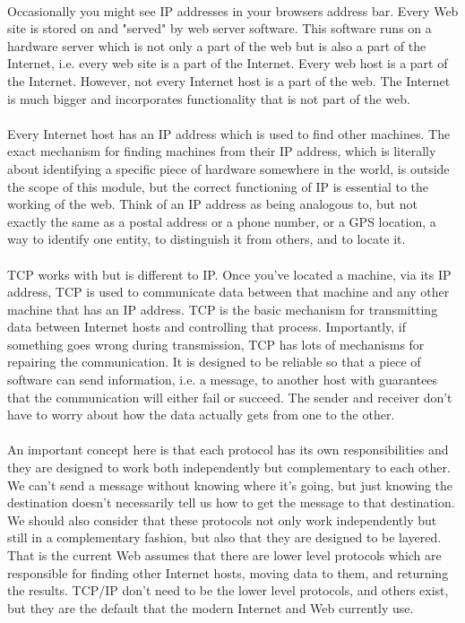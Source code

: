 \documentclass[12pt, a4paper, oneside]{book}
\begin{document}
\paragraph{} Occasionally you might see IP addresses in your browsers address bar. Every Web site is stored on and "served" by web server software. This software runs on a hardware server which is not only a part of the web but is also a part of the Internet, i.e. every web site is a part of the Internet. Every web host is a part of the Internet. However, not every Internet host is a part of the web. The Internet is much bigger and incorporates functionality that is not part of the web. 
\paragraph{} Every Internet host has an IP address which is used to find other machines. The exact mechanism for finding machines from their IP address, which is literally about identifying a specific piece of hardware somewhere in the world, is outside the scope of this module, but the correct functioning of IP is essential to the working of the web. Think of an IP address as being analogous to, but not exactly the same as a postal address or a phone number, or a GPS location, a way to identify one entity, to distinguish it from others, and to locate it.
\paragraph{} TCP works with but is different to IP. Once you've located a machine, via its IP address, TCP is used to communicate data between that machine and any other machine that has an IP address. TCP is the basic mechanism for transmitting data between Internet hosts and controlling that process. Importantly, if something goes wrong during transmission, TCP has lots of mechanisms for repairing the communication. It is designed to be reliable so that a piece of software can send information, i.e. a message, to another host with guarantees that the communication will either fail or succeed. The sender and receiver don't have to worry about how the data actually gets from one to the other.
\paragraph{} An important concept here is that each protocol has its own responsibilities and they are designed to work both independently but complementary to each other. We can't send a message without knowing where it's going, but just knowing the destination doesn't necessarily tell us how to get the message to that destination. We should also consider that these protocols not only work independently but still in a complementary fashion, but also that they are designed to be layered. That is the current Web assumes that there are lower level protocols which are responsible for finding other Internet hosts, moving data to them, and returning the results. TCP/IP don't need to be the lower level protocols, and others exist, but they are the default that the modern Internet and Web currently use.
\end{document}
